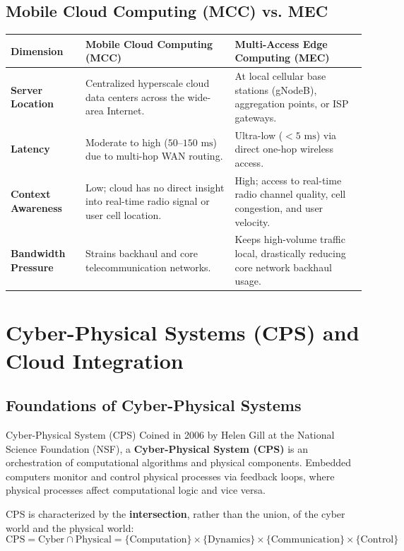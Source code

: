 \subsection{Mobile Cloud Computing (MCC) vs. MEC}
\begin{center}
\begin{tabularx}{\textwidth}{>{\bfseries}l X X}
\toprule
Dimension & Mobile Cloud Computing (MCC) & Multi-Access Edge Computing (MEC)\\
\midrule
Server Location & Centralized hyperscale cloud data centers across the wide-area Internet. & At local cellular base stations (gNodeB), aggregation points, or ISP gateways.\\
Latency & Moderate to high ($50\text{--}150\text{ ms}$) due to multi-hop WAN routing. & Ultra-low ($< 5\text{ ms}$) via direct one-hop wireless access.\\
Context Awareness & Low; cloud has no direct insight into real-time radio signal or user cell location. & High; access to real-time radio channel quality, cell congestion, and user velocity.\\
Bandwidth Pressure & Strains backhaul and core telecommunication networks. & Keeps high-volume traffic local, drastically reducing core network backhaul usage.\\
\bottomrule
\end{tabularx}
\end{center}

\section{Cyber-Physical Systems (CPS) and Cloud Integration}
\subsection{Foundations of Cyber-Physical Systems}
\begin{defbox}{Cyber-Physical System (CPS)}
Coined in 2006 by Helen Gill at the National Science Foundation (NSF), a \textbf{Cyber-Physical System (CPS)} is an orchestration of computational algorithms and physical components. Embedded computers monitor and control physical processes via feedback loops, where physical processes affect computational logic and vice versa.
\end{defbox}

CPS is characterized by the \textbf{intersection}, rather than the union, of the cyber world and the physical world:
\begin{equation}
\text{CPS} = \text{Cyber} \cap \text{Physical} = \{\text{Computation}\} \times \{\text{Dynamics}\} \times \{\text{Communication}\} \times \{\text{Control}\}
\end{equation}

